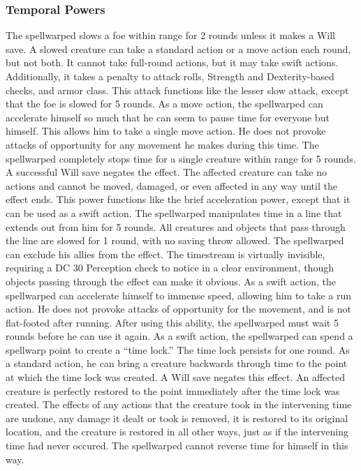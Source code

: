 \subsubsection{Temporal Powers}
 The spellwarped slows a foe within \rngclose range for 2 rounds unless it makes a Will save. A slowed creature can take a standard action or a move action each round, but not both. It cannot take full-round actions, but it may take swift actions. Additionally, it takes a  penalty to attack rolls, Strength and Dexterity-based checks, and armor class.
 This attack functions like the lesser slow attack, except that the foe is slowed for 5 rounds.
 As a move action, the spellwarped can accelerate himself so much that he can seem to pause time for everyone but himself. This allows him to take a single move action. He does not provoke attacks of opportunity for any movement he makes during this time.
 The spellwarped completely stops time for a single creature within \rngclose range for 5 rounds. A successful Will save negates the effect. The affected creature can take no actions and cannot be moved, damaged, or even affected in any way until the effect ends.
 This power functions like the brief acceleration power, except that it can be used as a swift action.
 The spellwarped manipulates time in a \arealarge line that extends out from him for 5 rounds. All creatures and objects that pass through the line are slowed for 1 round, with no saving throw allowed. The spellwarped can exclude his allies from the effect. The timestream is virtually invisible, requiring a DC 30 Perception check to notice in a clear environment, though objects passing through the effect can make it obvious.
 As a swift action, the spellwarped can accelerate himself to immense speed, allowing him to take a run action. He does not provoke attacks of opportunity for the movement, and is not flat-footed after running. After using this ability, the spellwarped must wait 5 rounds before he can use it again.
 As a swift action, the spellwarped can spend a spellwarp point to create a ``time lock.'' The time lock persists for one round. As a standard action, he can bring a creature backwards through time to the point at which the time lock was created. A Will save negates this effect. An affected creature is perfectly restored to the point immediately after the time lock was created. The effects of any actions that the creature took in the intervening time are undone, any damage it dealt or took is removed, it is restored to its original location, and the creature is restored in all other ways, just as if the intervening time had never occured. The spellwarped cannot reverse time for himself in this way.
